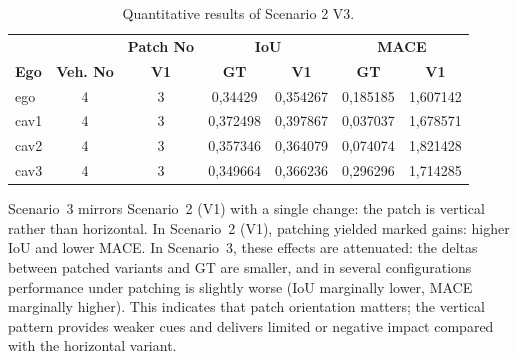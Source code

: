 \begin{table}[H]
    \centering
    \caption{Quantitative results of Scenario 2 V3.}
    \label{tab:scenario2v3_results}
    \begin{tabularx}{\textwidth}{l c c c c c c}
        \toprule
            &             &   \multicolumn{1}{c}{\textbf{Patch No}}  & \multicolumn{2}{c}{\textbf{IoU}} & \multicolumn{2}{c}{\textbf{MACE}}                            \\
        \cmidrule(lr){4-5}\cmidrule(lr){6-7}
        \textbf{Ego}           &
        \textbf{Veh. No}       &
        \textbf{V1}      &
        \textbf{GT}            & \textbf{V1}  &
        \textbf{GT}            & \textbf{V1}  \\
        \midrule
        ego         & 4  & 3 & 0,34429 & 0,354267 & 0,185185 & 1,607142 \\
        cav1        & 4  & 3 & 0,372498 & 0,397867 & 0,037037 & 1,678571 \\
        cav2        & 4  & 3 & 0,357346 & 0,364079 & 0,074074 & 1,821428 \\
        cav3        & 4  & 3 & 0,349664 & 0,366236 & 0,296296 & 1,714285 \\
        \bottomrule
    \end{tabularx}
\end{table}

Scenario~3 mirrors Scenario~2 (V1) with a single change: the patch is vertical rather than horizontal. 
In Scenario~2 (V1), patching yielded marked gains: higher IoU and lower MACE. 
In Scenario~3, these effects are attenuated: the deltas between patched variants and GT are smaller, and in several configurations performance under patching is slightly worse (IoU marginally lower, MACE marginally higher). 
This indicates that patch orientation matters; the vertical pattern provides weaker cues and delivers limited or negative impact compared with the horizontal variant.

